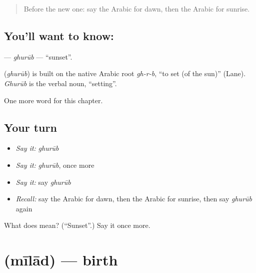 \label{lesson:AR-C233-ghurub}



\begin{quote}
Before the new one: say the Arabic for dawn, then the Arabic for sunrise.
\end{quote}

\subsection*{You'll want to know: }
\textbf{} — \emph{ghurūb} — \textquotedblleft{}sunset\textquotedblright{}.

\begin{cousinweb}
\textbf{} (\emph{ghurūb}) is built on the native Arabic root \emph{gh-r-b}, \textquotedblleft{}to set (of the sun)\textquotedblright{} (Lane). \emph{Ghurūb} is the verbal noun, \textquotedblleft{}setting\textquotedblright{}.
\end{cousinweb}

\begin{grammarlens}[title={What you've built}]
One more word for this chapter.
\end{grammarlens}

\subsection*{Your turn}
\begin{itemize}
\raggedright
  \item \emph{Say it:} \emph{ghurūb}
  \item \emph{Say it:} \emph{ghurūb}, once more
  \item \emph{Say it:} say \emph{ghurūb}
  \item \emph{Recall:} say the Arabic for dawn, then the Arabic for sunrise, then say \emph{ghurūb} again
\end{itemize}

\begin{tcolorbox}[breakable,colback=teal!4,colframe=teal!35!black,title={Before you move on}]
What does  mean? (\textquotedblleft{}Sunset\textquotedblright{}.) Say it once more.
\end{tcolorbox}
\section[\texorpdfstring{\ar{ميلاد} (mīlād)}{ميلاد (mīlād)}]{ (mīlād) — birth}

\label{lesson:AR-C233-milad}



